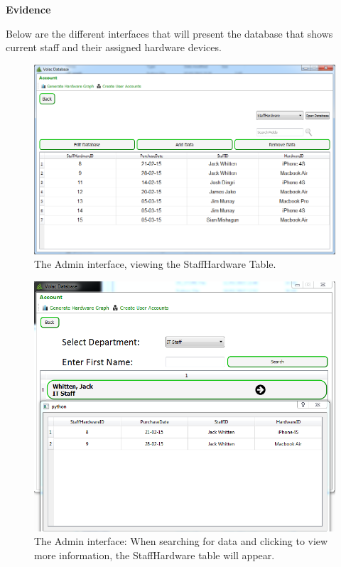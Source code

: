 \textbf{Evidence}

Below are the different interfaces that will present the database that shows current staff and their assigned hardware devices.

\begin{figure}[H]
    \includegraphics[width=\textwidth]{./Evaluation/Images/Database1.png}
    \caption{The Admin interface, viewing the StaffHardware Table.} \label{fig:db1}
\end{figure}

\begin{figure}[H]
    \includegraphics[width=\textwidth]{./Evaluation/Images/database3.png}
    \caption{The Admin interface: When searching for data and clicking to view more information, the StaffHardware table will appear.} \label{fig:db2}
\end{figure}

